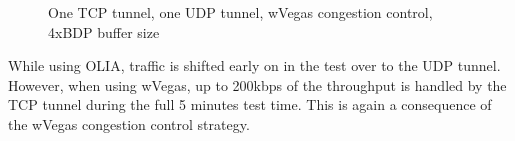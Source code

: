 \begin{figure}[H]
  \centering

  \caption{One TCP tunnel, one UDP tunnel, wVegas congestion control, 4xBDP
  buffer size}
  \label{fig:wvegas-mptcp-4}
\end{figure}

While using OLIA, traffic is shifted early on in the test over to the UDP
tunnel. However, when using wVegas, up to 200kbps of the throughput is handled
by the TCP tunnel during the full 5 minutes test time. This is again a
consequence of the wVegas congestion control strategy.

